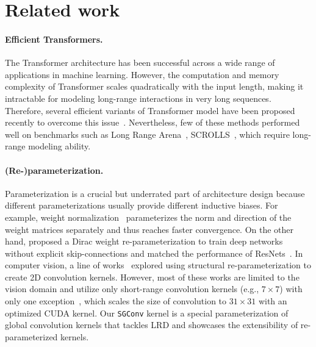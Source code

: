 \section{Related work}\label{sec: relatedwork}
\paragraph{Efficient Transformers.} The Transformer architecture \citep{vaswani2017attention} has been successful across a wide range of applications in machine learning. However, the computation and memory complexity of Transformer scales quadratically with the input length, making it intractable for modeling long-range interactions in very long sequences. Therefore, several efficient variants of Transformer model have been proposed recently to overcome this issue~\citep{child2019generating,wang2020linformer, kitaev2019reformer,zaheer2020big,tay2020synthesizer,peng2021random,qin2021cosformer,luo2021stable}. Nevertheless, few of these methods performed well on benchmarks such as Long Range Arena~\citep{tay2020long}, SCROLLS~\citep{shaham2022scrolls}, which require long-range modeling ability.

\paragraph{(Re-)parameterization.}
Parameterization is a crucial but underrated part of architecture design because different parameterizations usually provide different inductive biases. For example, weight normalization~\citep{salimans2016weight} parameterizes the norm and direction of the weight matrices separately and thus reaches faster convergence. On the other hand, \citet{zagoruyko2017diracnets} proposed a Dirac weight re-parameterization to train deep networks without explicit skip-connections and matched the performance of ResNets~\citep{he2016deep}. In computer vision, a line of works~\citep{ding2019acnet,guo2020expandnets,ding2021repvgg,cao2022conv} explored using structural re-parameterization to create 2D convolution kernels. However, most of these works are limited to the vision domain and utilize only short-range convolution kernels (e.g., $7\times7$) with only one exception~\citep{ding2022scaling}, which scales the size of convolution to $31\times 31$ with an optimized CUDA kernel. Our \texttt{SGConv} kernel is a special parameterization of global convolution kernels that tackles LRD and showcases the extensibility of re-parameterized kernels.

